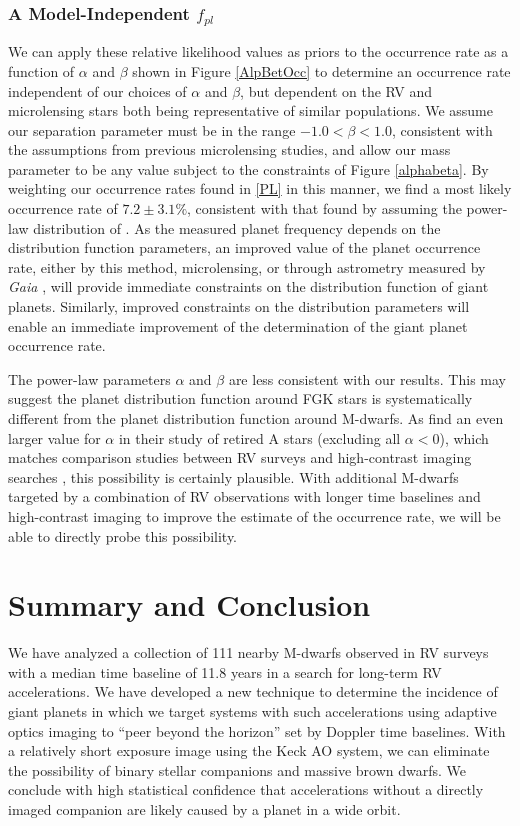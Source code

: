 \subsubsection{A Model-Independent $f_{pl}$}
We can apply these relative likelihood values as priors to the occurrence rate as a function of $\alpha$ and $\beta$ shown in Figure \ref{AlpBetOcc} to determine an occurrence rate independent of our choices of $\alpha$ and $\beta$, but dependent on the RV and microlensing stars both being representative of similar populations. We assume our separation parameter must be in the range $-1.0 < \beta < 1.0$, consistent with the assumptions from previous microlensing studies, and allow our mass parameter to be any value subject to the constraints of Figure \ref{alphabeta}. By weighting our occurrence rates found in \textsection\ref{PL} in this manner, we find a most likely occurrence rate of $7.2 \pm 3.1\%$, consistent with that found by assuming the power-law distribution of \citet{Cumming08}. As the measured planet frequency depends on the distribution function parameters, an improved value of the planet occurrence rate, either by this method, microlensing, or through astrometry measured by \textit{Gaia} \citep{Casertano08}, will provide immediate constraints on the distribution function of giant planets. Similarly, improved constraints on the distribution parameters will enable an immediate improvement of the determination of the giant planet occurrence rate.

The \citet{Cumming08} power-law parameters $\alpha$ and $\beta$ are less consistent with our results. This may suggest the planet distribution function around FGK stars is systematically different from the planet distribution function around M-dwarfs. As \citet{Bowler10} find an even larger value for $\alpha$ in their study of retired A stars (excluding all $\alpha < 0$), which matches comparison studies between RV surveys and high-contrast imaging searches \citep{Crepp11}, this possibility is certainly plausible. With additional M-dwarfs targeted by a combination of RV observations with longer time baselines and high-contrast imaging to improve the estimate of the occurrence rate, we will be able to directly probe this possibility.




\section{Summary and Conclusion}
\label{SC}
We have analyzed a collection of 111 nearby M-dwarfs observed in RV surveys with a median time baseline of 11.8 years in a search for long-term RV accelerations. We have developed a new technique to determine the incidence of giant planets in which we target systems with such accelerations using adaptive optics imaging to ``peer beyond the horizon'' set by Doppler time baselines. With a relatively short exposure image using the Keck AO system, we can eliminate the possibility of binary stellar companions and massive brown dwarfs. We conclude with high statistical confidence that accelerations without a directly imaged companion are likely caused by a planet in a wide orbit. 

